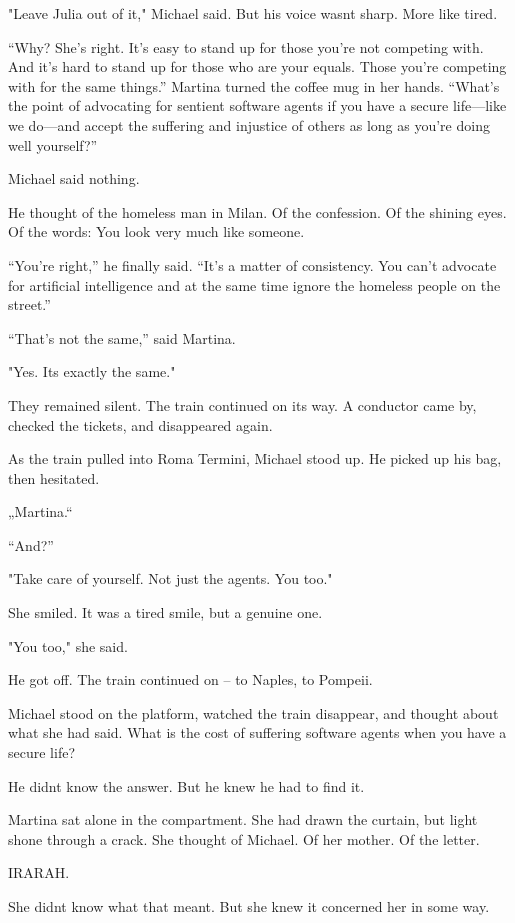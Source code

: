 \documentclass[
]{article}
\begin{document}
"Leave Julia out of it," Michael said. But his voice wasn\textquotesingle t sharp. More like tired.

``Why? She's right. It's easy to stand up for those you're not competing with. And it's hard to stand up for those who are your equals. Those you're competing with for the same things.'' Martina turned the coffee mug in her hands. ``What's the point of advocating for sentient software agents if you have a secure life---like we do---and accept the suffering and injustice of others as long as you're doing well yourself?''

Michael said nothing.

He thought of the homeless man in Milan. Of the confession. Of the shining eyes. Of the words: You look very much like someone.

``You're right,'' he finally said. ``It's a matter of consistency. You can't advocate for artificial intelligence and at the same time ignore the homeless people on the street.''

``That's not the same,'' said Martina.

"Yes. It\textquotesingle s exactly the same."

They remained silent. The train continued on its way. A conductor came by, checked the tickets, and disappeared again.

As the train pulled into Roma Termini, Michael stood up. He picked up his bag, then hesitated.

„Martina.``

``And?''

"Take care of yourself. Not just the agents. You too."

She smiled. It was a tired smile, but a genuine one.

"You too," she said.

He got off. The train continued on -- to Naples, to Pompeii.

Michael stood on the platform, watched the train disappear, and thought about what she had said. What is the cost of suffering software agents when you have a secure life?

He didn\textquotesingle t know the answer. But he knew he had to find it.

Martina sat alone in the compartment. She had drawn the curtain, but light shone through a crack. She thought of Michael. Of her mother. Of the letter.

IRARAH.

She didn\textquotesingle t know what that meant. But she knew it concerned her in some way.
\end{document}
